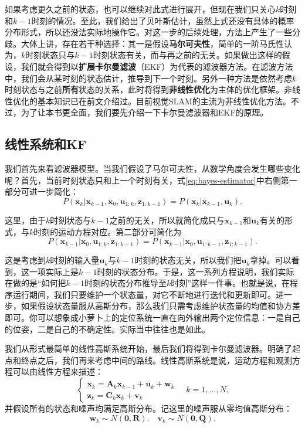 如果考虑更久之前的状态，也可以继续对此式进行展开，但现在我们只关心$k$时刻和$k-1$时刻的情况。至此，我们给出了贝叶斯估计，虽然上式还没有具体的概率分布形式，所以还没法实际地操作它。对这一步的后续处理，方法上产生了一些分歧。大体上讲，存在若干种选择：其一是假设\textbf{马尔可夫性}，简单的一阶马氏性认为，$k$时刻状态只与$k-1$时刻状态有关，而与再之前的无关。如果做出这样的假设，我们就会得到以\textbf{扩展卡尔曼滤波}（EKF）为代表的滤波器方法。在滤波方法中，我们会从某时刻的状态估计，推导到下一个时刻。另外一种方法是依然考虑$k$时刻状态与之前\textbf{所有}状态的关系，此时将得到\textbf{非线性优化}为主体的优化框架。非线性优化的基本知识已在前文介绍过。目前视觉SLAM的主流为非线性优化方法。不过，为了让本书更全面，我们要先介绍一下卡尔曼滤波器和EKF的原理。

\subsection{线性系统和KF}
我们首先来看滤波器模型。当我们假设了马尔可夫性，从数学角度会发生哪些变化呢？首先，当前时刻状态只和上一个时刻有关，式\eqref{eq:bayes-estimator}中右侧第一部分可进一步简化：
\begin{equation}
P\left( {{\bm{x}_k}|{\bm{x}_{k - 1}},{\bm{x}_0},{\bm{u}_{1:k}},{\bm{z}_{1:k - 1}}} \right) = P\left( {{\bm{x}_k}|{\bm{x}_{k - 1}},{\bm{u}_k}} \right).
\end{equation}

这里，由于$k$时刻状态与$k-1$之前的无关，所以就简化成只与$\bm{x}_{k-1}$和$\bm{u}_k$有关的形式，与${k}$时刻的运动方程对应。第二部分可简化为
\begin{equation}
P\left( {{\bm{x}_{k - 1}}|{\bm{x}_0},{\bm{u}_{1:k}},{\bm{z}_{1:k - 1}}} \right) = P\left( {{\bm{x}_{k - 1}}|{\bm{x}_0},{\bm{u}_{1:k - 1}},{\bm{z}_{1:k - 1}}} \right).
\end{equation}

这是考虑到$k$时刻的输入量$\bm{u}_k$与$k-1$时刻的状态无关，所以我们把$\bm{u}_k$拿掉。可以看到，这一项实际上是$k-1$时刻的状态分布。于是，这一系列方程说明，我们实际在做的是“如何把$k-1$时刻的状态分布推导至$k$时刻”这样一件事。也就是说，在程序运行期间，我们只要维护一个状态量，对它不断地进行迭代和更新即可。进一步，如果假设状态量服从高斯分布，那么我们只需考虑维护状态量的均值和协方差即可。你可以想象成小萝卜上的定位系统一直在向外输出两个定位信息：一是自己的位姿，二是自己的不确定性。实际当中往往也是如此。

我们从形式最简单的线性高斯系统开始，最后我们将得到卡尔曼滤波器。明确了起点和终点之后，我们再来考虑中间的路线。线性高斯系统是说，运动方程和观测方程可以由线性方程来描述：
\begin{equation}
\left\{ \begin{array}{l}
{\bm{x}_k} = \bm{A}_k {{\bm{x}_{k - 1}}+{\bm{u}_k}} + \bm{w}_k \\
{\bm{z}_{k}} = \bm{C}_k  { \bm{x}_k} + \bm{v}_{k} \end{array} \right. \quad k=1, \ldots, N .
\end{equation}
并假设所有的状态和噪声均满足高斯分布。记这里的噪声服从零均值高斯分布：
\begin{equation}
\bm{w}_k \sim N(\bm{0}, \bm{R}). \quad \bm{v}_k \sim N( \bm{0}, \bm{Q}).
\end{equation}

